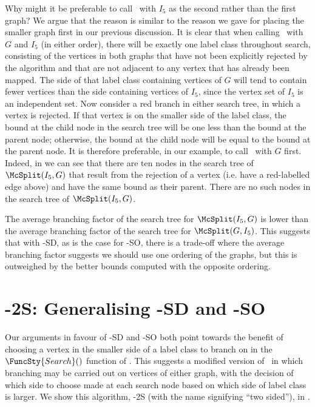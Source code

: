 Why might it be preferable to call \McSplit\ with $I_5$ as the second
rather than the first graph?  We argue
that the reason is similar to the reason we gave for placing the smaller graph
first in our previous discussion.  It is clear that when calling \McSplit\ with
$G$ and $I_5$ (in either order), there will be exactly one label class throughout
search, consisting of the vertices in both graphs that have not been explicitly
rejected by the algorithm and that are not adjacent to any vertex that has already
been mapped.  The side of that label class containing vertices of $G$ will tend to
contain fewer vertices than the side containing vertices of $I_5$, since the vertex set of $I_5$ is
an independent set.  
Now consider a red branch in either search tree, in which a vertex is rejected.
If that vertex is on the smaller side of the label class, the bound at the child node
in the search tree will be one less than the bound at the parent node; otherwise,
the bound at the child node will be equal to the bound at the parent node.  It is
therefore preferable, in our example, to call \McSplit\ with $G$ first.  Indeed,
in  we can see that there are ten
nodes in the search tree of $\McSplit(I_5, G)$ that result from the rejection of
a vertex (i.e. have a red-labelled edge above) and have the same bound as their
parent.  There are no such nodes in the search tree of $\McSplit(I_5, G)$.

The average branching factor of the search tree for $\McSplit(I_5, G)$ is lower
than the average branching factor of the search tree for $\McSplit(G, I_5)$.  This
suggests that with \McSplit-SD, as is the case for \McSplit-SO, there is a trade-off
where the average branching factor suggests we should use one ordering of the
graphs, but this is outweighed by the better bounds computed with the opposite
ordering.

\section{\McSplit-2S: Generalising \McSplit-SD and \McSplit-SO}\label{sec:mcsplit2}

Our arguments in favour of \McSplit-SD and \McSplit-SO both point towards the
benefit of choosing a vertex in the smaller side of a label class to branch on
in the $\FuncSty{Search}()$ function of \McSplit.  This suggests a modified
version of \McSplit\ in which branching may be carried out on vertices of
either graph, with the decision of which side to choose made at each search
node based on which side of label class is larger.  We show this
algorithm, \McSplit-2S (with the name signifying ``two sided''), in
.

